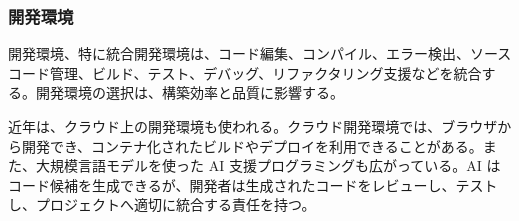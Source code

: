 \subsubsection{開発環境}

開発環境、特に統合開発環境は、コード編集、コンパイル、エラー検出、ソースコード管理、ビルド、テスト、デバッグ、リファクタリング支援などを統合する。開発環境の選択は、構築効率と品質に影響する。

近年は、クラウド上の開発環境も使われる。クラウド開発環境では、ブラウザから開発でき、コンテナ化されたビルドやデプロイを利用できることがある。また、大規模言語モデルを使った AI 支援プログラミングも広がっている。AI はコード候補を生成できるが、開発者は生成されたコードをレビューし、テストし、プロジェクトへ適切に統合する責任を持つ。
